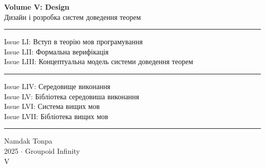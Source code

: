 \documentclass{book}
\begin{document}
\begin{titlepage}
    \centering
    \vspace*{0.5in}
    \Huge
    \textbf{Volume V: Design} \\
    \LARGE
    Дизайн і розробка систем доведення теорем \\
    \vspace{1.5in}
    \small
    \flushleft
    \vspace{-2mm} \rule{\textwidth}{0.4pt}
    Issue LI: Вступ в теорію мов програмування \\
    Issue LII: Формальна верифікація \\
    Issue LIII: Концептуальна модель системи доведення теорем \\
    \vspace{-2mm} \rule{\textwidth}{0.4pt}
    Issue LIV: Середовище виконання \\
    Issue LV: Бібліотека середовиша виконання \\
    Issue LVI: Система вищих мов \\
    Issue LVII: Бібліотека вищих мов \\
    \vspace{-2mm} \rule{\textwidth}{0.4pt}
    \centering
    \vfill
    \large
    Namdak Tonpa \\
    \Large
    2025 $\cdot$ Groupoid Infinity \\
    V
\end{titlepage}

\tableofcontents
\newif\ifincludeTOC








\end{document}
